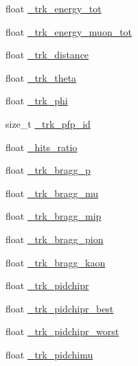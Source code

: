 \begin{DoxyCompactItemize}
\item 
float \hyperlink{classselection_1_1CC0piNpSelection_a8a0da0081e2f182880249debba6551e3}{\+\_\+trk\+\_\+energy\+\_\+tot}
\item 
float \hyperlink{classselection_1_1CC0piNpSelection_aebac9c09110d469f5d7ed3817c33e437}{\+\_\+trk\+\_\+energy\+\_\+muon\+\_\+tot}
\item 
float \hyperlink{classselection_1_1CC0piNpSelection_a0f16777192fbed04bcc67edfdfa67e6b}{\+\_\+trk\+\_\+distance}
\item 
float \hyperlink{classselection_1_1CC0piNpSelection_a08cd38de74e9611829a3580a310c19f2}{\+\_\+trk\+\_\+theta}
\item 
float \hyperlink{classselection_1_1CC0piNpSelection_a85a6029e249e3ff20ea6d8eaabf22142}{\+\_\+trk\+\_\+phi}
\item 
size\+\_\+t \hyperlink{classselection_1_1CC0piNpSelection_a641e7e656a28a5b31a5c8ab21dad9d3b}{\+\_\+trk\+\_\+pfp\+\_\+id}
\item 
float \hyperlink{classselection_1_1CC0piNpSelection_a32b43003c9168115bc94544049e439a2}{\+\_\+hits\+\_\+ratio}
\item 
float \hyperlink{classselection_1_1CC0piNpSelection_a52d578481ee7dd4fed45f8e3c8ed44da}{\+\_\+trk\+\_\+bragg\+\_\+p}
\item 
float \hyperlink{classselection_1_1CC0piNpSelection_a9e7b081beb0ef9129f15a7fb965276f1}{\+\_\+trk\+\_\+bragg\+\_\+mu}
\item 
float \hyperlink{classselection_1_1CC0piNpSelection_aec1e4d27216773ec40bc66ab5c217abc}{\+\_\+trk\+\_\+bragg\+\_\+mip}
\item 
float \hyperlink{classselection_1_1CC0piNpSelection_a5371981bb5f02024c2ba1d986541ffd9}{\+\_\+trk\+\_\+bragg\+\_\+pion}
\item 
float \hyperlink{classselection_1_1CC0piNpSelection_ac9b23583581239191762cfb60307fb78}{\+\_\+trk\+\_\+bragg\+\_\+kaon}
\item 
float \hyperlink{classselection_1_1CC0piNpSelection_a712eaf6dc6086f1be5705a3bbe5226fc}{\+\_\+trk\+\_\+pidchipr}
\item 
float \hyperlink{classselection_1_1CC0piNpSelection_aaf0a2841494bc52da55d267bc3c8db3d}{\+\_\+trk\+\_\+pidchipr\+\_\+best}
\item 
float \hyperlink{classselection_1_1CC0piNpSelection_a6c06ff43f89cbee19cf466b830a6fe38}{\+\_\+trk\+\_\+pidchipr\+\_\+worst}
\item 
float \hyperlink{classselection_1_1CC0piNpSelection_a74ddf5622f3ee32110e9342361020a89}{\+\_\+trk\+\_\+pidchimu}

\end{DoxyCompactItemize}
